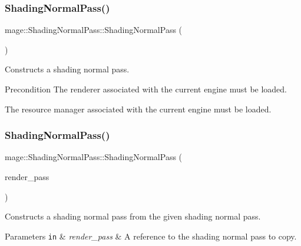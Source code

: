 \subsubsection{\texorpdfstring{Shading\+Normal\+Pass()}{ShadingNormalPass()}\hspace{0.1cm}{\footnotesize\ttfamily [1/3]}}
{\footnotesize\ttfamily mage\+::\+Shading\+Normal\+Pass\+::\+Shading\+Normal\+Pass (\begin{DoxyParamCaption}{ }\end{DoxyParamCaption})}

Constructs a shading normal pass.

\begin{DoxyPrecond}{Precondition}
The renderer associated with the current engine must be loaded. 

The resource manager associated with the current engine must be loaded. 
\end{DoxyPrecond}
\hypertarget{classmage_1_1_shading_normal_pass_ab13b45f9a3118f8494150d64ff06f94f}{}\label{classmage_1_1_shading_normal_pass_ab13b45f9a3118f8494150d64ff06f94f} 
\subsubsection{\texorpdfstring{Shading\+Normal\+Pass()}{ShadingNormalPass()}\hspace{0.1cm}{\footnotesize\ttfamily [2/3]}}
{\footnotesize\ttfamily mage\+::\+Shading\+Normal\+Pass\+::\+Shading\+Normal\+Pass (\begin{DoxyParamCaption}\item[{const \hyperlink{classmage_1_1_shading_normal_pass}{Shading\+Normal\+Pass} \&}]{render\+\_\+pass }\end{DoxyParamCaption})\hspace{0.3cm}{\ttfamily [delete]}}

Constructs a shading normal pass from the given shading normal pass.


\begin{DoxyParams}[1]{Parameters}
\mbox{\tt in}  & {\em render\+\_\+pass} & A reference to the shading normal pass to copy. \\
\hline
\end{DoxyParams}
\hypertarget{classmage_1_1_shading_normal_pass_ab5d2c287dd28b0161a0b267373e264ff}{}\label{classmage_1_1_shading_normal_pass_ab5d2c287dd28b0161a0b267373e264ff} 
